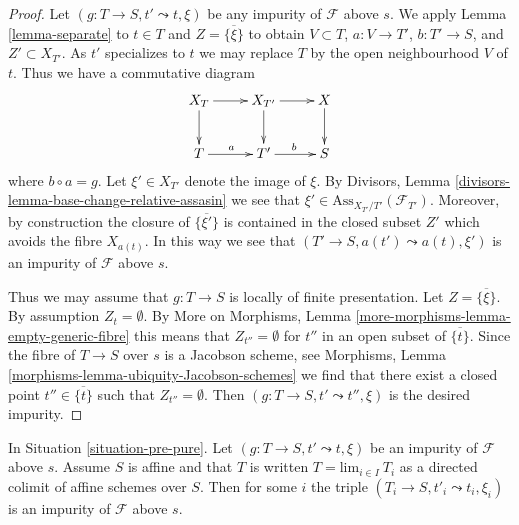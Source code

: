 \begin{proof}
Let $(g : T \to S, t' \leadsto t, \xi)$ be any impurity of
$\mathcal{F}$ above $s$. We apply
Lemma \ref{lemma-separate}
to $t \in T$ and $Z = \overline{\{\xi\}}$ to obtain
$V \subset T$, $a : V \to T'$, $b : T' \to S$, and $Z' \subset X_{T'}$.
As $t'$ specializes to $t$ we may replace $T$ by the open neighbourhood
$V$ of $t$. Thus we have a commutative diagram
$$
\xymatrix{
X_T \ar[d] \ar[r] &
X_{T'} \ar[d] \ar[r] &
X \ar[d] \\
T \ar[r]^a & T' \ar[r]^b & S
}
$$
where $b \circ a = g$. Let $\xi' \in X_{T'}$ denote the
image of $\xi$. By
Divisors, Lemma \ref{divisors-lemma-base-change-relative-assasin}
we see that $\xi' \in \text{Ass}_{X_{T'}/T'}(\mathcal{F}_{T'})$.
Moreover, by construction the closure of $\overline{\{\xi'\}}$
is contained in the closed subset $Z'$ which avoids the fibre
$X_{a(t)}$. In this way we see that $(T' \to S, a(t') \leadsto a(t), \xi')$
is an impurity of $\mathcal{F}$ above $s$.

\medskip\noindent
Thus we may assume that $g : T \to S$ is locally of finite presentation.
Let $Z = \overline{\{\xi\}}$. By assumption $Z_t = \emptyset$. By
More on Morphisms, Lemma \ref{more-morphisms-lemma-empty-generic-fibre}
this means that $Z_{t''} = \emptyset$ for $t''$ in an open subset
of $\overline{\{t\}}$. Since the fibre of
$T \to S$ over $s$ is a Jacobson scheme, see
Morphisms, Lemma \ref{morphisms-lemma-ubiquity-Jacobson-schemes}
we find that there exist a closed point $t'' \in \overline{\{t\}}$ such that
$Z_{t''} = \emptyset$. Then $(g : T \to S, t' \leadsto t'', \xi)$ is the
desired impurity.
\end{proof}

\begin{lemma}
\label{lemma-impure-limit}
In Situation \ref{situation-pre-pure}.
Let $(g : T \to S, t' \leadsto t, \xi)$ be an impurity of
$\mathcal{F}$ above $s$. Assume $S$ is affine and that $T$
is written $T = \text{lim}_{i \in I}\ T_i$ as a directed colimit
of affine schemes over $S$. Then for some $i$ the triple
$(T_i \to S, t'_i \leadsto t_i, \xi_i)$ is an impurity of
$\mathcal{F}$ above $s$.
\end{lemma}

